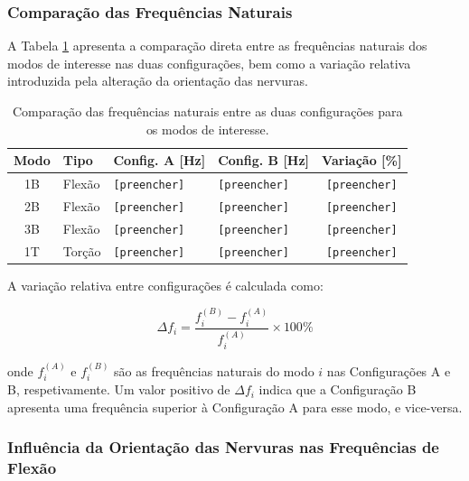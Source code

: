 \documentclass[a4paper,fleqn,noprintline]{cas-dc}
\begin{document}
\subsubsection{Comparação das Frequências Naturais}

A Tabela \ref{tab:comparacao_freqs} apresenta a comparação direta entre as frequências naturais dos modos de interesse nas duas configurações, bem como a variação relativa introduzida pela alteração da orientação das nervuras.

\begin{table}[h!]
\centering
\caption{Comparação das frequências naturais entre as duas configurações para os modos de interesse.}
\label{tab:comparacao_freqs}
\renewcommand{\arraystretch}{1.4}
\begin{tabularx}{\textwidth}{c l X X c} %
\toprule
\textbf{Modo} & \textbf{Tipo} & \textbf{Config. A [\si{\hertz}]} & \textbf{Config. B [\si{\hertz}]} & \textbf{Variação [\%]} \\
\midrule
1B & Flexão & \texttt{[preencher]} & \texttt{[preencher]} & \texttt{[preencher]} \\
2B & Flexão & \texttt{[preencher]} & \texttt{[preencher]} & \texttt{[preencher]} \\
3B & Flexão & \texttt{[preencher]} & \texttt{[preencher]} & \texttt{[preencher]} \\
1T & Torção & \texttt{[preencher]} & \texttt{[preencher]} & \texttt{[preencher]} \\
\bottomrule
\end{tabularx}
\end{table}

A variação relativa entre configurações é calculada como:

\begin{equation}
    \Delta f_i = \frac{f_i^{(B)} - f_i^{(A)}}{f_i^{(A)}} 
    \times 100\%
    \label{eq:variacao_freq}
\end{equation}

\noindent onde $f_i^{(A)}$ e $f_i^{(B)}$ são as frequências naturais do modo $i$ nas Configurações A e B, respetivamente. Um valor positivo de $\Delta f_i$ indica que a Configuração B apresenta uma frequência superior à Configuração A para esse modo, e vice-versa.

\subsubsection{Influência da Orientação das Nervuras nas 
Frequências de Flexão}
\end{document}
